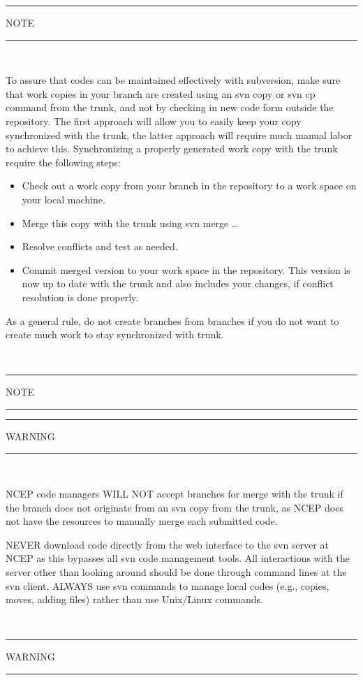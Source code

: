 \documentclass[12pt]{article}
\newcommand{\file}{\sf}
\begin{document}
\begin{center}
\rule[1mm]{55mm}{1.0mm} NOTE \rule[1mm]{55mm}{1.0mm} \\ 
\vspace{\baselineskip} \label{svn_n}
\parbox{120mm}{To assure that codes can be maintained effectively with
  subversion, make sure that work copies in your branch are created using an
  {\file svn copy} or {\file svn cp} command from the trunk, and not by
  checking in new code form outside the repository. The first approach will
  allow you to easily keep your copy synchronized with the trunk, the latter
  approach will require much manual labor to achieve this. Synchronizing a
  properly generated work copy with the trunk require the following steps:
\begin{itemize}
\item Check out a work copy from your branch in the repository to a work space
      on your local machine.
\item Merge this copy with the trunk using {\file svn merge \ldots}
\item Resolve conflicts and test as needed.
\item Commit merged version to your work space in the repository. This version
      is now up to date with the trunk and also includes your changes, if
      conflict resolution is done properly.
\end{itemize}
As a general rule, do not create branches from branches if you do not want to
create much work to stay synchronized with trunk.} \\
\vspace{\baselineskip} \rule[1mm]{55mm}{1.0mm} NOTE \rule[1mm]{55mm}{1.0mm}
\end{center}

\vspace{\baselineskip}
\begin{center}
\rule[1mm]{55mm}{1.0mm} WARNING \rule[1mm]{55mm}{1.0mm} \\ 
\vspace{\baselineskip} \label{svn_w}
\parbox{120mm}{NCEP code managers WILL NOT accept branches for merge with the
trunk if the branch does not originate from an {\file svn copy} from the
trunk, as NCEP does not have the resources to manually merge each submitted
code.

\vspace{\baselineskip} \noindent 
NEVER download code directly from the web interface to the svn server at NCEP
as this bypasses all svn code management tools. All interactions with the
server other than looking around should be done through command lines at the
svn client. ALWAYS use svn commands to manage local codes (e.g., copies,
moves, adding files) rather than use Unix/Linux commands.} \\
\vspace{\baselineskip} \rule[1mm]{55mm}{1.0mm} WARNING \rule[1mm]{55mm}{1.0mm}
\end{center}
\end{document}
